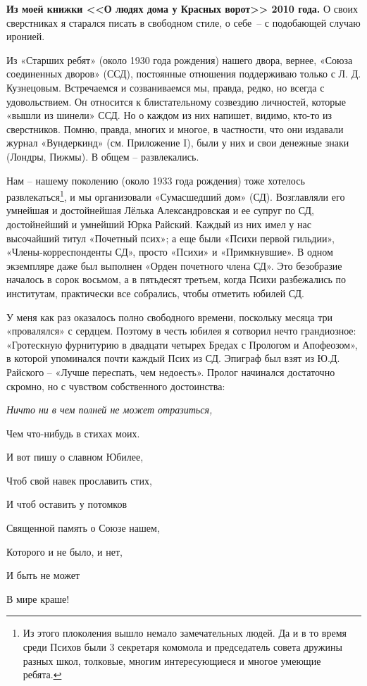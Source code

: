\indent

\textbf{Из моей книжки <<О людях дома у Красных ворот>> 2010 года.} О своих сверстниках я старался писать в свободном стиле, о себе~-- с подобающей случаю иронией.

﻿Из «Старших ребят» (около 1930 года рождения) нашего двора, вернее, «Союза соединенных дворов» (ССД), постоянные отношения поддерживаю только с Л. Д. Кузнецовым. Встречаемся и созваниваемся мы, правда, редко, но всегда с удовольствием. Он относится к блистательному созвездию личностей, которые «вышли из шинели» ССД. Но о каждом из них напишет, видимо, кто-то из сверстников. Помню, правда, многих и многое, в частности,  что они издавали журнал  «Вундеркинд» (см. Приложение I), были у них и свои денежные знаки (Лондры, Пижмы). В общем – развлекались.

Нам – нашему поколению (около 1933 года рождения) тоже хотелось развлекаться\footnote{Из этого плоколения вышло немало замечательных людей. Да и в то время среди Психов были 3 секретаря комомола и председатель совета дружины разных школ, толковые, многим интересующиеся и многое умеющие ребята.}, и мы организовали «Сумасшедший дом» (СД). Возглавляли его умнейшая и достойнейшая Лёлька Александровская и ее супруг по СД, достойнейший и умнейший Юрка Райский. Каждый из них имел у нас высочайший титул «Почетный псих»; а еще были «Психи первой гильдии», «Члены-корреспонденты СД», просто «Психи» и «Примкнувшие». В одном экземпляре даже был выполнен «Орден почетного члена СД». Это безобразие началось в сорок восьмом, а в пятьдесят     третьем,    когда     Психи     разбежались      по институтам, практически все собрались, чтобы отметить юбилей СД.

У меня как раз оказалось полно свободного времени, поскольку месяца три «провалялся» с сердцем. Поэтому в честь юбилея я сотворил нечто грандиозное: «Гротескную фурнитурию в двадцати четырех Бредах с Прологом и Апофеозом», в которой упоминался почти каждый Псих из СД. Эпиграф был взят из Ю.Д. Райского –   «Лучше переспать, чем недоесть». Пролог начинался достаточно скромно, но с чувством собственного достоинства: 

\newpage
{}






\restoregeometry

{\itshape
    Ничто ни в чем полней не может отразиться,
    
	Чем что-нибудь в стихах моих.
	
	И вот пишу о славном Юбилее,
	
	Чтоб свой навек прославить стих,
	
	И чтоб оставить у потомков
	
	Священной память о Союзе нашем,
	
	Которого и не было, и нет,
	
	И быть не может
	
	В мире краше!
}


